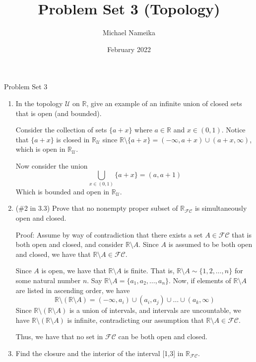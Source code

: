 \documentclass[12pt]{article}
\title{Problem Set 3 (Topology)}
\author{Michael Nameika}
\date{February 2022}
\begin{document}
\maketitle
\begin{center}
Problem Set 3
\end{center}

 \begin{enumerate}%
\item In the topology $\mathcal{U}$ on $\mathbb{R}$, give an example of an infinite union of closed sets that is open (and bounded).

Consider the collection of sets $\{a + x\}$ where $a \in \mathbb{R}$ and $x \in (0,1)$. Notice that $\{a + x\}$ is closed in $\mathbb{R}_{\mathcal{U}}$ since $\mathbb{R} \setminus \{a + x\} = (-\infty, a + x) \cup (a + x, \infty)$, which is open in $\mathbb{R}_{\mathcal{U}}$. 

Now consider the union
\[\bigcup_{x \in (0,1)} \{a + x\} = (a, a+ 1)\]
Which is bounded and open in $\mathbb{R}_{\mathcal{U}}$.


\item (\#2 in 3.3) Prove that no nonempty proper subset of $\mathbb{R}_{\mathcal{FC}}$ is simultaneously open and closed.

Proof: Assume by way of contradiction that there exists a set $A \in \mathcal{FC}$ that is both open and closed, and consider $\mathbb{R} \setminus A$. Since $A$ is assumed to be both open and closed, we have that $\mathbb{R} \setminus A \in \mathcal{FC}$. 

Since $A$ is open, we have that $\mathbb{R} \setminus A$ is finite. 
That is, $\mathbb{R} \setminus A \sim \{1, 2, \ldots, n\}$ for some natural number $n$. 
Say $\mathbb{R}\setminus A = \{a_1, a_2, \ldots, a_n\}$. Now, if elements of $\mathbb{R} \setminus A$ are listed in ascending order, we have
\[\mathbb{R} \setminus (\mathbb{R} \setminus A) = (- \infty, a_i) \cup (a_i, a_j) \cup \ldots \cup (a_k, \infty)\]
Since $\mathbb{R} \setminus (\mathbb{R} \setminus A)$ is a union of intervals, and intervals are uncountable, we have $\mathbb{R} \setminus (\mathbb{R} \setminus A)$ is infinite, contradicting our assumption that $\mathbb{R} \setminus A \in \mathcal{FC}$.

Thus, we have that no set in $\mathcal{FC}$ can be both open and closed.


\item Find the closure and the interior of the interval [1,3] in $\mathbb{R}_{\mathcal{FC}}$.


\end{enumerate}
\end{document}

